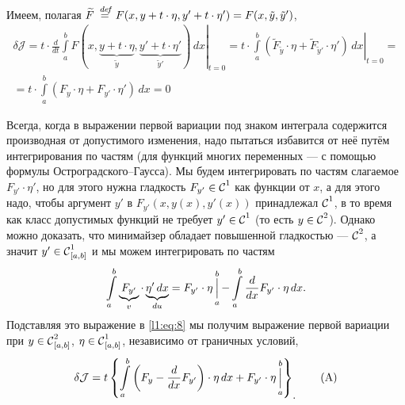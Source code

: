 \documentclass[12pt,a4paper,openany,fleqn]{book}
\newcommand {\defeq}{\stackrel{\hspace{0.09 cm}de\!f}{=}}
\newcommand {\eqdef}{\defeq}
\newcommand{\Cf}{\ensuremath{\mathcal{C}}}
\newcommand{\J}{\ensuremath{\mathcal{J}}}
\newcommand{\Cfn}[2][]{\ensuremath{\Cf{\mathstrut}^{#2}_{#1}}}
\newcommand{\der}[2]{\ensuremath{\frac{d#1}{d#2}}}
\newcommand{\dd}{\ensuremath{d}}
\theoremstyle{definition}
\begin{document}
	Имеем, полагая $\widetilde{F}\eqdef F(x,y+t\cdot\eta,y'+t\cdot\eta')=F(x,\tilde{y},\tilde{y}')$,
	\begin{multline}
		\label{l1:eq:8}
		\delta\J=t\cdot\left.\der{}{t}\int\limits_a^b F(x,\underbrace{y+t\cdot\eta}_{\tilde{y}},\underbrace{y'+t\cdot\eta'}_{\tilde{y}'})\,\dd{x}\right|_{t=0}=t\cdot\left.\int\limits_a^b \left(\widetilde{F}_{\tilde{y}}\cdot\eta+\widetilde{F}_{\tilde{y}'}\cdot\eta'\right)\,\dd{x}\right|_{t=0}=\\
		=t\cdot\int\limits_a^b \left({F}_{{y}}\cdot\eta+{F}_{{y}'}\cdot\eta'\right)\,\dd{x}=0
	\end{multline}
	
	Всегда, когда в выражении первой вариации под знаком интеграла содержится производная от допустимого изменения, надо пытаться избавится от неё путём интегрирования по частям (для функций многих переменных --- с помощью формулы Остроградского--Гаусса). Мы будем интегрировать по частям слагаемое $F_{y'}\cdot\eta'$, но для этого нужна гладкость $F_{y'}\in\Cfn[]{1}$ как функции от $x$, а для этого надо, чтобы аргумент $y'$ в $F_{y'}(x,y(x),y'(x))$ принадлежал \Cfn[]{1}, в то время как класс допустимых функций не требует $y'\in\Cfn[]{1}$ (то есть $y\in\Cfn[]{2}$). Однако можно доказать, что минимайзер обладает повышенной гладкостью --- \Cfn[]{2}, а значит $y'\in\Cfn[{[a,b]}]{1}$ и мы можем интегрировать по частям
	\begin{equation}
		\label{l1:eq:9}
		\hfill\int\limits_a^b \underbrace{F_{y'}}_{v}\cdot\underbrace{\eta'\,\dd{x}}_{du}=F_{y'}\cdot\eta\mathop{\Big|}\limits_a^b-\int\limits_a^b \der{}{x}F_{y'}\cdot\eta\,\dd{x}.\hfill
	\end{equation}
	Подставляя это выражение в \eqref{l1:eq:8} мы получим выражение первой вариации при $y\in\Cfn[{[a,b]}]{2}$, $\eta\in\Cfn[{[a,b]}]{1}$, независимо от граничных условий,
	\begin{equation}
		\label{l1:eq:A}
		\hfill \delta\J=t\left\{\int\limits_a^b\left(F_y-\der{}{x}F_{y'}\right)\cdot\eta\,\dd{x}+F_{y'}\cdot\eta\mathop{\Big|}\limits_a^b\right\}_{\displaystyle.}\hfill\tag{A}
	\end{equation}
	
\end{document}
